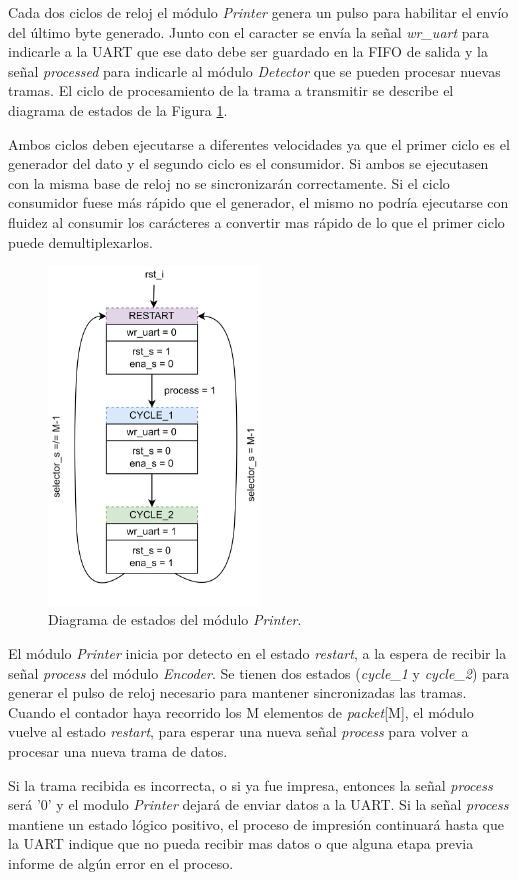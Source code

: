 	Cada dos ciclos de reloj el módulo \textit{Printer} genera un pulso para habilitar el envío del último byte generado. Junto con el caracter se envía la señal \textit{wr\_uart} para indicarle a la UART que ese dato debe ser guardado en la FIFO de salida y la señal \textit{processed} para indicarle al módulo \textit{Detector} que se pueden procesar nuevas tramas. El ciclo de procesamiento de la trama a transmitir se describe el diagrama de estados de la Figura \ref{fig:Printer_FSMD}.
	
	Ambos ciclos deben ejecutarse a diferentes velocidades ya que el primer ciclo es el generador del dato y el segundo ciclo es el consumidor. Si ambos se ejecutasen con la misma base de reloj no se sincronizarán correctamente. Si el ciclo consumidor fuese más rápido que el generador, el mismo no podría ejecutarse con fluidez al consumir los carácteres a convertir mas rápido de lo que el primer ciclo puede demultiplexarlos.
	
	\begin{figure}[H]
		\centering
		\includegraphics[width=0.5\textwidth]{Figuras/Printer_FSMD.png}
		\centering\caption{Diagrama de estados del módulo \textit{Printer}.}
		\label{fig:Printer_FSMD}
	\end{figure}
	
	El módulo \textit{Printer} inicia por detecto en el estado \textit{restart}, a la espera de recibir la señal \textit{process} del módulo \textit{Encoder}. Se tienen dos estados (\textit{cycle\_1} y \textit{cycle\_2}) para generar el pulso de reloj necesario para mantener sincronizadas las tramas. Cuando el contador haya recorrido los M elementos de \textit{packet}[M], el módulo vuelve al estado \textit{restart}, para esperar una nueva señal \textit{process} para volver a procesar una nueva trama de datos.
	
	Si la trama recibida es incorrecta, o si ya fue impresa, entonces la señal \textit{process} será '0' y el modulo \textit{Printer} dejará de enviar datos a la UART. Si la señal \textit{process} mantiene un estado lógico positivo, el proceso de impresión continuará hasta que la UART indique que no pueda recibir mas datos o que alguna etapa previa informe de algún error en el proceso.